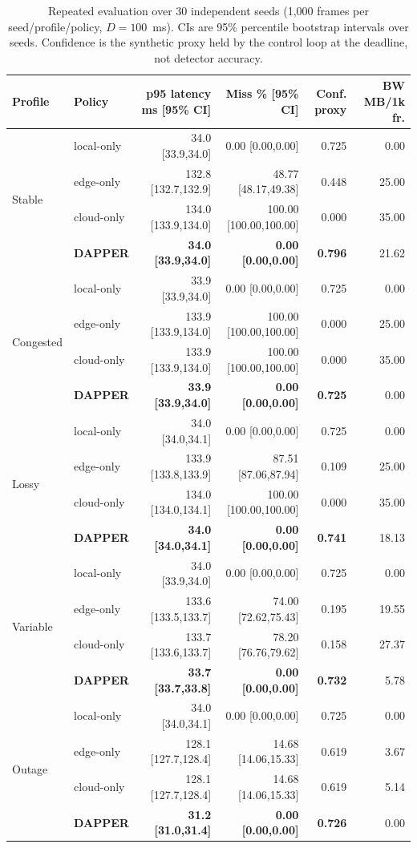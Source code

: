 \documentclass[conference,a4paper]{IEEEtran}
\begin{document}
\begin{table}[t]
\centering
\caption{Repeated evaluation over 30 independent seeds (1,000 frames per seed/profile/policy, $D=100$~ms). CIs are 95\% percentile bootstrap intervals over seeds. Confidence is the synthetic proxy held by the control loop at the deadline, not detector accuracy.}
\label{tab:main}
\scriptsize
\renewcommand{\arraystretch}{0.82}
\begin{tabular}{@{}llrrrr@{}}
\toprule
Profile & Policy & p95 latency ms [95\% CI] & Miss \% [95\% CI] & Conf. proxy & BW MB/1k fr. \\
\midrule
\multirow{4}{*}{Stable}
& local-only & 34.0 [33.9,34.0] & 0.00 [0.00,0.00] & 0.725 & 0.00 \\
& edge-only  & 132.8 [132.7,132.9] & 48.77 [48.17,49.38] & 0.448 & 25.00 \\
& cloud-only & 134.0 [133.9,134.0] & 100.00 [100.00,100.00] & 0.000 & 35.00 \\
& \textbf{DAPPER} & \textbf{34.0 [33.9,34.0]} & \textbf{0.00 [0.00,0.00]} & \textbf{0.796} & 21.62 \\
\midrule
\multirow{4}{*}{Congested}
& local-only & 33.9 [33.9,34.0] & 0.00 [0.00,0.00] & 0.725 & 0.00 \\
& edge-only  & 133.9 [133.9,134.0] & 100.00 [100.00,100.00] & 0.000 & 25.00 \\
& cloud-only & 133.9 [133.9,134.0] & 100.00 [100.00,100.00] & 0.000 & 35.00 \\
& \textbf{DAPPER} & \textbf{33.9 [33.9,34.0]} & \textbf{0.00 [0.00,0.00]} & \textbf{0.725} & 0.00 \\
\midrule
\multirow{4}{*}{Lossy}
& local-only & 34.0 [34.0,34.1] & 0.00 [0.00,0.00] & 0.725 & 0.00 \\
& edge-only  & 133.9 [133.8,133.9] & 87.51 [87.06,87.94] & 0.109 & 25.00 \\
& cloud-only & 134.0 [134.0,134.1] & 100.00 [100.00,100.00] & 0.000 & 35.00 \\
& \textbf{DAPPER} & \textbf{34.0 [34.0,34.1]} & \textbf{0.00 [0.00,0.00]} & \textbf{0.741} & 18.13 \\
\midrule
\multirow{4}{*}{Variable}
& local-only & 34.0 [33.9,34.0] & 0.00 [0.00,0.00] & 0.725 & 0.00 \\
& edge-only  & 133.6 [133.5,133.7] & 74.00 [72.62,75.43] & 0.195 & 19.55 \\
& cloud-only & 133.7 [133.6,133.7] & 78.20 [76.76,79.62] & 0.158 & 27.37 \\
& \textbf{DAPPER} & \textbf{33.7 [33.7,33.8]} & \textbf{0.00 [0.00,0.00]} & \textbf{0.732} & 5.78 \\
\midrule
\multirow{4}{*}{Outage}
& local-only & 34.0 [34.0,34.1] & 0.00 [0.00,0.00] & 0.725 & 0.00 \\
& edge-only  & 128.1 [127.7,128.4] & 14.68 [14.06,15.33] & 0.619 & 3.67 \\
& cloud-only & 128.1 [127.7,128.4] & 14.68 [14.06,15.33] & 0.619 & 5.14 \\
& \textbf{DAPPER} & \textbf{31.2 [31.0,31.4]} & \textbf{0.00 [0.00,0.00]} & \textbf{0.726} & 0.00 \\
\bottomrule
\end{tabular}
\end{table}
\end{document}
